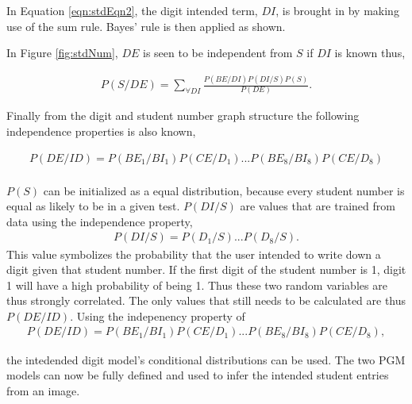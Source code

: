 In Equation \ref{eqn:stdEqn2}, the digit intended term, $DI$, is brought in by making use of the sum rule. Bayes' rule is then applied as shown.

In Figure \ref{fig:stdNum}, $DE$ is seen to be independent from $S$ if $DI$ is known thus,

\begin{align}
  P(S/DE)	=  \sum_{\forall DI}^{}  \frac{P(BE/DI)P(DI/S)P(S)}{P(DE)}.
\label{eqn:stdEqn3}
\end{align}

Finally from the digit and student number graph structure the following independence properties is also known,



\begin{align}
P(DE/ID) = P(BE_1/BI_1)P(CE/D_1)...P(BE_8/BI_8)P(CE/D_8)\\
\label{eqn:stdEqn4}
\end{align}


$P(S)$ can be initialized as a equal distribution, because every student number is equal as likely to be in a given test. $P(DI/S)$ are values that are trained from data using the independence property, 
\begin{align}
P(DI/S) = P(D_1/S)...P(D_8/S).
\label{eqn:stdEqn4}
\end{align}
This value symbolizes the probability that the user intended to write down a digit given that student number. If the first digit of the student number is 1, digit 1 will have a high probability of being 1. Thus these two random variables are thus strongly correlated. The only values that still needs to be calculated are thus $P(DE/ID)$. Using the indepenency property of \begin{align}
P(DE/ID) = P(BE_1/BI_1)P(CE/D_1)...P(BE_8/BI_8)P(CE/D_8),
\label{eqn:stdEqn4}
\end{align}

the intedended digit model's conditional distributions can be used. The two PGM models can now be fully defined and used to infer the intended student entries from an image.